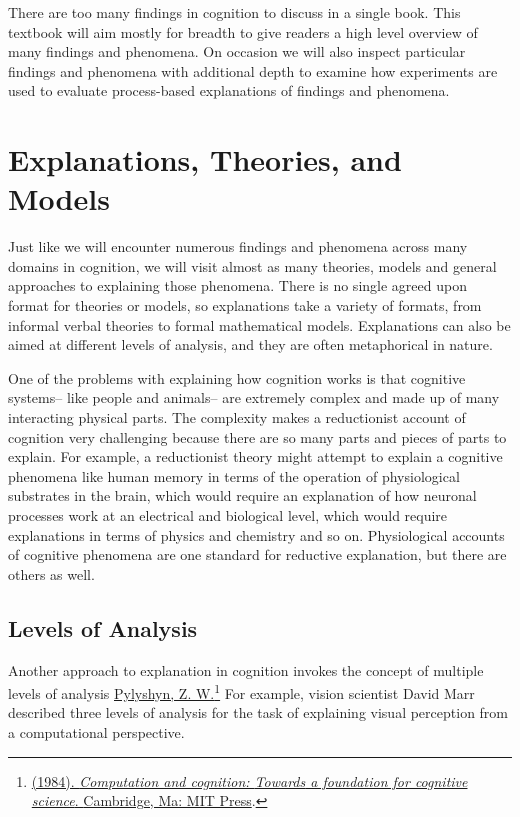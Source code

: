 \documentclass[
  oneside,
  12pt]{crumpbook}
\begin{document}
There are too many findings in cognition to discuss in a single book. This textbook will aim mostly for breadth to give readers a high level overview of many findings and phenomena. On occasion we will also inspect particular findings and phenomena with additional depth to examine how experiments are used to evaluate process-based explanations of findings and phenomena.

\hypertarget{explanations-theories-and-models}{%
\section{Explanations, Theories, and Models}\label{explanations-theories-and-models}}

Just like we will encounter numerous findings and phenomena across many domains in cognition, we will visit almost as many theories, models and general approaches to explaining those phenomena. There is no single agreed upon format for theories or models, so explanations take a variety of formats, from informal verbal theories to formal mathematical models. Explanations can also be aimed at different levels of analysis, and they are often metaphorical in nature.

One of the problems with explaining how cognition works is that cognitive systems-- like people and animals-- are extremely complex and made up of many interacting physical parts. The complexity makes a reductionist account of cognition very challenging because there are so many parts and pieces of parts to explain. For example, a reductionist theory might attempt to explain a cognitive phenomena like human memory in terms of the operation of physiological substrates in the brain, which would require an explanation of how neuronal processes work at an electrical and biological level, which would require explanations in terms of physics and chemistry and so on. Physiological accounts of cognitive phenomena are one standard for reductive explanation, but there are others as well.

\hypertarget{levels-of-analysis}{%
\subsection{Levels of Analysis}\label{levels-of-analysis}}

Another approach to explanation in cognition invokes the concept of multiple levels of analysis \protect\hyperlink{ref-pylyshynComputationCognitionFoundation1984}{Pylyshyn, Z. W.}\footnote{\protect\hyperlink{ref-pylyshynComputationCognitionFoundation1984}{(1984). \emph{Computation and cognition: {Towards} a foundation for cognitive science}. {Cambridge, Ma: MIT Press}}.} For example, vision scientist David Marr described three levels of analysis for the task of explaining visual perception from a computational perspective.
\end{document}
